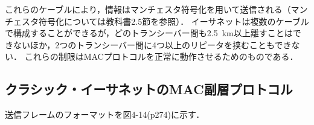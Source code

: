 \documentclass[a4paper]{ltjsarticle}
\begin{document}
これらのケーブルにより，情報はマンチェスタ符号化を用いて送信される（マンチェスタ符号化については教科書2.5節を参照）．
イーサネットは複数のケーブルで構成することができるが，どのトランシーバー間も\SI{2.5}{km}以上離すことはできないほか，2つのトランシーバー間に4つ以上のリピータを挟むこともできない．
これらの制限はMACプロトコルを正常に動作させるためのものである．

\subsection{クラシック・イーサネットのMAC副層プロトコル}\label{ux30afux30e9ux30b7ux30c3ux30afux30a4ux30fcux30b5ux30cdux30c3ux30c8ux306emacux526fux5c64ux30d7ux30edux30c8ux30b3ux30eb}

送信フレームのフォーマットを図4-14(p274)に示す．
\end{document}
